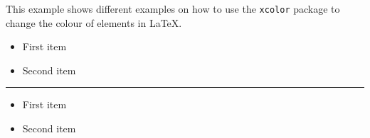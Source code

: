 \documentclass{article}
\begin{document}
This example shows different examples on how to use the \texttt{xcolor} package 
to change the colour of elements in \LaTeX.

\begin{itemize}
\color{blue}
\item First item
\item Second item
\end{itemize}

\noindent
{\color{red} \rule{\linewidth}{0.5mm} }
\newpage

\begin{itemize}
\color{green}
\item First item
\item Second item
\end{itemize}
\end{document}
